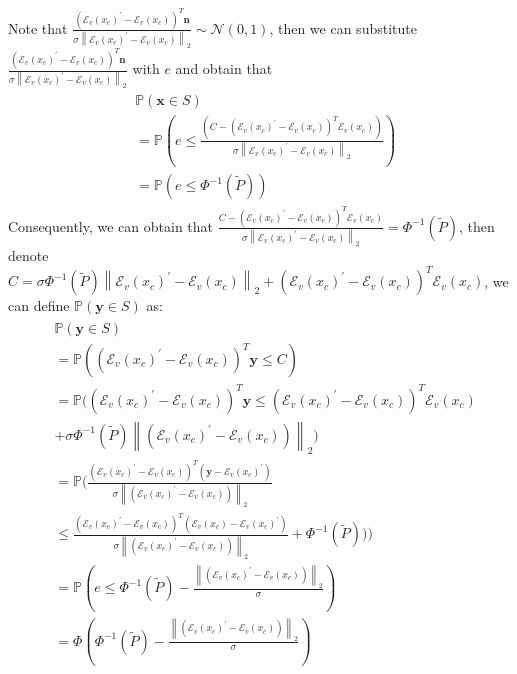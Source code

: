 Note that $\frac{(\mathcal{E}_v(x_c)^{\prime} - \mathcal{E}_v(x_c))^T\mathbf{n}}{\sigma\left\|\mathcal{E}_v(x_c)^{\prime}-\mathcal{E}_{v}(x_c)\right\|_2}\sim\mathcal{N}(0, 1)$, then we can substitute $\frac{(\mathcal{E}_v(x_c)^{\prime} - \mathcal{E}_v(x_c))^T\mathbf{n}}{\sigma\left\|\mathcal{E}_v(x_c)^{\prime}-\mathcal{E}_{v}(x_c)\right\|_2}$ with $e$ and obtain that 
\begin{align}
\begin{split}
&\mathbb{P}(\mathbf{x}\in S)\\
&=\mathbb{P}(e\leq \frac{(C - (\mathcal{E}_v(x_c)^{\prime} - \mathcal{E}_v(x_c))^T\mathcal{E}_v(x_c))}{\sigma\left\|\mathcal{E}_v(x_c)^{\prime} - \mathcal{E}_v(x_c)\right\|_2})\\
&=\mathbb{P}(e\leq\Phi^{-1}(\tilde{P}))
\end{split}
\end{align}
Consequently, we can obtain that 
$\frac{C - (\mathcal{E}_v(x_c)^{\prime} - \mathcal{E}_v(x_c))^T\mathcal{E}_v(x_c)}{\sigma\left\|\mathcal{E}_v(x_c)^{\prime} - \mathcal{E}_v(x_c)\right\|_2}=\Phi^{-1}(\tilde{P})$, then denote $C =\sigma\Phi^{-1}(\tilde{P})\left\|\mathcal{E}_v(x_c)^{\prime} - \mathcal{E}_v(x_c)\right\|_2+(\mathcal{E}_v(x_c)^{\prime} - \mathcal{E}_v(x_c))^T\mathcal{E}_v(x_c)$, we can define $\mathbb{P}(\mathbf{y}\in S)$ as: 
\begin{align}
\begin{split}
&\mathbb{P}(\mathbf{y}\in S)\\
&=\mathbb{P}((\mathcal{E}_v(x_c)^{\prime} - \mathcal{E}_v(x_c))^T\mathbf{y}\leq C)\\
&=\mathbb{P}((\mathcal{E}_v(x_c)^{\prime} - \mathcal{E}_v(x_c))^T\mathbf{y}\leq(\mathcal{E}_v(x_c)^{\prime} - \mathcal{E}_v(x_c))^T\mathcal{E}_v(x_c)\\
&+\sigma\Phi^{-1}(\tilde{P})\left\|(\mathcal{E}_v(x_c)^{\prime} - \mathcal{E}_v(x_c))\right\|_2)\\
&=\mathbb{P}(\frac{(\mathcal{E}_v(x_c)^{\prime} - \mathcal{E}_v(x_c))^T(\mathbf{y}-\mathcal{E}_v(x_c)^{\prime})}{\sigma\left\|(\mathcal{E}_v(x_c)^{\prime} - \mathcal{E}_v(x_c))\right\|_2}\\
&\leq\frac{(\mathcal{E}_v(x_c)^{\prime} - \mathcal{E}_v(x_c))^T(\mathcal{E}_v(x_c) - \mathcal{E}_v(x_c)^{\prime})}{\sigma\left\|(\mathcal{E}_v(x_c)^{\prime} - \mathcal{E}_v(x_c))\right\|_2}+\Phi^{-1}(\tilde{P})))\\
&=\mathbb{P}(e\leq\Phi^{-1}(\tilde{P})-\frac{\left\|(\mathcal{E}_v(x_c)^{\prime} - \mathcal{E}_v(x_c))\right\|_2}{\sigma})\\
&=\Phi(\Phi^{-1}(\tilde{P})-\frac{\left\|(\mathcal{E}_v(x_c)^{\prime} - \mathcal{E}_v(x_c))\right\|_2}{\sigma})
\end{split}
\end{align}
